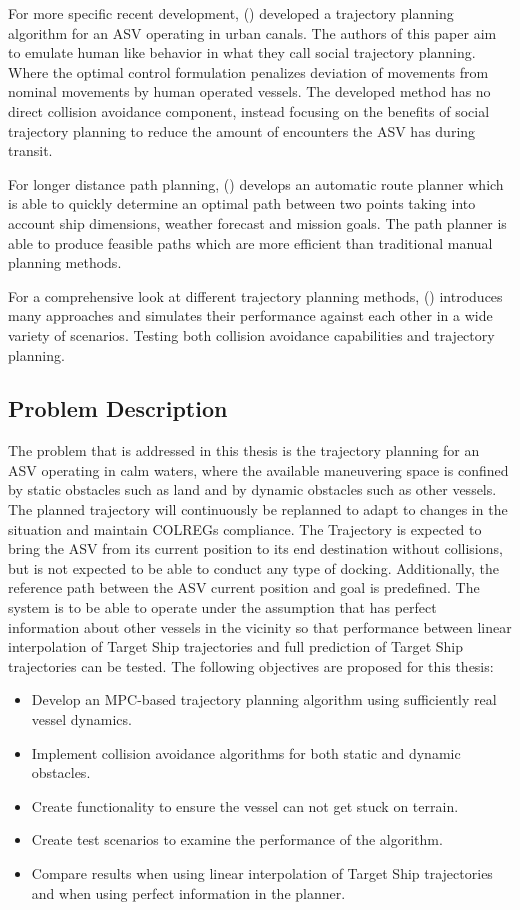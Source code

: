 For more specific recent development, (\cite{park2020social}) developed a trajectory planning algorithm for an ASV operating in urban canals. The
authors of this paper aim to emulate human like behavior in what they call social trajectory planning. Where the optimal control formulation
penalizes deviation of movements from nominal movements by human operated vessels. The developed method has no direct collision avoidance component,
instead focusing on the benefits of social trajectory planning to reduce the amount of encounters the ASV has during transit.

For longer distance path planning, (\cite{vestad2019automatic}) develops an automatic route planner which is able to quickly
determine an optimal path between two points taking into account ship dimensions, weather forecast and mission goals. The
path planner is able to produce feasible paths which are more efficient than traditional manual planning methods.

For a comprehensive look at different trajectory planning methods, (\cite{loe2008collision}) introduces many
approaches and simulates their performance against each other in a wide variety of scenarios. Testing both collision avoidance capabilities and
trajectory planning.

\subsection{Problem Description}
The problem that is addressed in this thesis is the trajectory planning for an \gls{ASV} operating in calm waters,
where the available maneuvering space is confined by static obstacles such as land and by dynamic obstacles such as other vessels.
The planned trajectory will continuously be replanned to adapt to changes in the situation and maintain COLREGs compliance.
The Trajectory is expected to bring the \gls{ASV} from its current position to its end destination without collisions, but is not expected to be able to conduct
any type of docking. Additionally, the reference path between the \gls{ASV} current position and goal is predefined.
The system is to be able to operate under the assumption that has perfect information
about other vessels in the vicinity so that performance between linear interpolation of Target Ship trajectories
and full prediction of Target Ship trajectories can be tested.
The following objectives are proposed for this thesis:
\begin{itemize}
    \item Develop an MPC-based trajectory planning algorithm using sufficiently real vessel dynamics.
    \item Implement collision avoidance algorithms for both static and dynamic obstacles.
    \item Create functionality to ensure the vessel can not get stuck on terrain.
    \item Create test scenarios to examine the performance of the algorithm.
    \item Compare results when using linear interpolation of Target Ship trajectories and when using perfect information in the planner.
\end{itemize}


